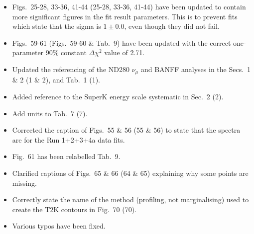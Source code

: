 \begin{itemize}
\item Figs.\ 25-28, 33-36, 41-44 {\color{red}(25-28, 33-36, 41-44)} have been updated to contain
  more significant figures in the fit result parameters. This is to prevent fits which state
  that the sigma is $1\pm0.0$, even though they did not fail.

\item Figs.\ 59-61 {\color{red}(Figs.\ 59-60 \& Tab.\ 9)} have been updated with the correct one-parameter 90\% constant $\Delta \chi^2$ value
  of 2.71.
  
  
\item Updated the referencing of the ND280 $\nu_\mu$ and BANFF analyses in the Secs.\ 1 \& 2 {\color{red}(1 \& 2)}, and
  Tab.\ 1 {\color{red}(1)}.

\item Added reference to the SuperK energy scale systematic in Sec.\ 2 {\color{red}(2)}.

\item Add units to Tab.\ 7 {\color{red}(7)}.

\item Corrected the caption of Figs.\ 55 \& 56 {\color{red}(55 \& 56)} to state that the spectra are for
  the Run 1+2+3+4a data fits.

\item Fig.\ 61 has been relabelled Tab.\ {\color{red}9}.

\item Clarified captions of Figs.\ 65 \& 66 {\color{red}(64 \& 65)} explaining why some points are missing.

\item Correctly state the name of the method (profiling, not marginalising) used to create the
  T2K contours in Fig.\ 70 {\color{red}(70)}.

\item Various typos have been fixed.
  
\end{itemize}





